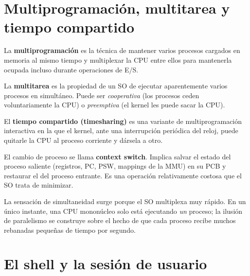 \documentclass[11pt,a4paper]{article}
\begin{document}
\section{Multiprogramación, multitarea y tiempo compartido}

\begin{definicion}
La \textbf{multiprogramación} es la técnica de mantener varios
procesos cargados en memoria al mismo tiempo y multiplexar la CPU
entre ellos para mantenerla ocupada incluso durante operaciones de
E/S.
\end{definicion}

\begin{definicion}
La \textbf{multitarea} es la propiedad de un SO de ejecutar
aparentemente varios procesos en simultáneo. Puede ser
\emph{cooperativa} (los procesos ceden voluntariamente la CPU) o
\emph{preemptiva} (el kernel les puede sacar la CPU).
\end{definicion}

\begin{definicion}
El \textbf{tiempo compartido (timesharing)} es una variante de
multiprogramación interactiva en la que el kernel, ante una
interrupción periódica del reloj, puede quitarle la CPU al proceso
corriente y dársela a otro.
\end{definicion}

El cambio de proceso se llama \textbf{context switch}. Implica salvar
el estado del proceso saliente (registros, PC, PSW, mappings de la
MMU) en su PCB y restaurar el del proceso entrante. Es una operación
relativamente costosa que el SO trata de minimizar.

\begin{idea}
La sensación de simultaneidad surge porque el SO multiplexa muy
rápido. En un único instante, una CPU mononúcleo solo está ejecutando
\emph{un} proceso; la ilusión de paralelismo se construye sobre el
hecho de que cada proceso recibe muchos rebanadas pequeñas de tiempo
por segundo.
\end{idea}

\section{El shell y la sesión de usuario}
\end{document}
